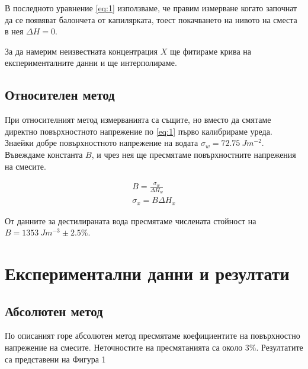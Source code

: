 \documentclass[reprint,amsmath,amssymb,aps,floatfix]{revtex4-2}
\begin{document}
В последното уравнение \eqref{eq:1} използваме, че правим измерване когато започнат да се появяват балончета от капилярката, тоест покачването на нивото на сместа в нея $\Delta H = 0$. 

За да намерим неизвестната концентрация $X$ ще фитираме крива на експерименталните данни и ще интерполираме. 

\subsection{Относителен метод}

При относителният метод измерванията са същите, но вместо да смятаме директно повърхностното напрежение по \eqref{eq:1} първо калибрираме уреда. Знаейки добре повърхностното напрежение на водата $\sigma_w = 72.75 \ \si{J m^{-2}}$. Въвеждаме константа $B$, и чрез нея ще пресмятаме повърхностните напрежения на смесите. 

\begin{gather*}
    B = \frac{\sigma_w}{\Delta H_w} \\
    \sigma_x = B \Delta H_x 
\end{gather*}

От данните за дестилираната вода пресмятаме числената стойност на $B = 1353 \ \si{Jm^{-3}} \pm 2.5\% $. 

\section{Експериментални данни и резултати}
\subsection{Абсолютен метод}

По описаният горе абсолютен метод пресмятаме коефициентите на повърхностно напрежение на смесите. Неточностите на пресмятанията са около $3\%$. Резултатите са представени на Фигура 1 
\end{document}

